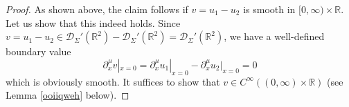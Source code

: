 \documentclass[10pt,a4paper]{article}
\theoremstyle{plain}
\theoremstyle{definition}
\theoremstyle{remark}
\numberwithin{equation}{section}
\newcommand{\R}{\mathbb{R}}
\begin{document}
\begin{proof}
As shown above, the claim follows if $v = u_1 - u_2 $ is smooth in $[0,\infty) \times \R$. 
Let us show that this indeed holds. 
Since $v  = u_1 - u_2  \in \mathcal{D}_\Sigma' (\R^2)  - \mathcal{D}_\Sigma' (\R^2)   = \mathcal{D}_\Sigma' (\R^2)  $, we have a well-defined boundary value 
\[
\partial_x^\mu v|_{x=0} = \partial_x^\mu u_1|_{x=0} - \partial_x^\mu u_2|_{x=0} = 0
\]
which is obviously smooth.   
It suffices to show that $v \in C^\infty( (0,\infty) \times \R)$ (see Lemma \ref{ooiiqweh} below). 







\end{proof}
\end{document}
